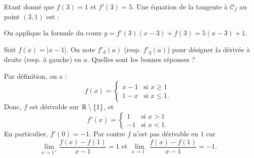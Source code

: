 \begin{question}

Etant donné que $\displaystyle f(3)=1$ et $f'(3)=5$. Une équation de la tangente à $\mathscr{C}_f$ au point $(3,1)$ est :
\begin{answers}  
\end{answers}
\begin{explanations}
On applique la formule du cours $\displaystyle y=f'(3)(x-3)+f(3)=5(x-3)+1$.
\end{explanations}
\end{question}



\begin{question}

Soit $\displaystyle f(x)=|x-1|$. On note $f'_d(a)$ (resp. $f'_g(a)$) pour désigner la dérivée à droite (resp. à gauche) en $a$. Quelles sont les bonnes réponses ?
\begin{answers}  
\end{answers}
\begin{explanations}
Par définition, on a :
$$f(x)=\left\{ \begin{array}{ll}x-1&\mbox{si }x\geq 1\\ 1-x&\mbox{si }x\leq 1.
\end{array}\right.$$
Donc, $f$ est dérivable sur $\mathbb{R}\setminus\{1\}$, et
$$f'(x)=\left\{ \begin{array}{ll}1&\mbox{si }x> 1\\ -1&\mbox{si }x< 1.
\end{array}\right.$$
En particulier, $f'(0)=-1$. Par contre $f$ n'est pas dérivable en $1$ car
$$\lim _{x\to 1^+}\frac{f(x)-f(1)}{x-1}=1 \mbox{ et }\lim _{x\to 1^-}\frac{f(x)-f(1)}{x-1}=-1.$$
\end{explanations}
\end{question}




